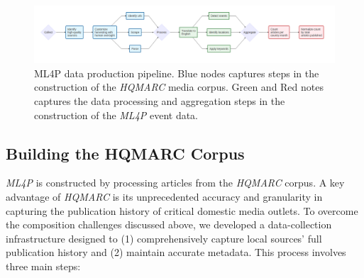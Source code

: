 \documentclass[
  letterpaper,
  DIV=11,
  numbers=noendperiod]{scrartcl}
\begin{document}
\begin{figure}

{\centering \includegraphics[width=6.77083in,height=\textheight]{mermaid_full.png}

}

\caption{\label{fig-mermaid}ML4P data production pipeline. Blue nodes
captures steps in the construction of the \emph{HQMARC} media corpus.
Green and Red notes captures the data processing and aggregation steps
in the construction of the \emph{ML4P} event data.}

\end{figure}

\hypertarget{building-the-hqmarc-corpus}{%
\subsection{Building the HQMARC
Corpus}\label{building-the-hqmarc-corpus}}

\emph{ML4P} is constructed by processing articles from the \emph{HQMARC}
corpus. A key advantage of \emph{HQMARC} is its unprecedented accuracy
and granularity in capturing the publication history of critical
domestic media outlets. To overcome the composition challenges discussed
above, we developed a data-collection infrastructure designed to (1)
comprehensively capture local sources' full publication history and (2)
maintain accurate metadata. This process involves three main steps:
\end{document}
